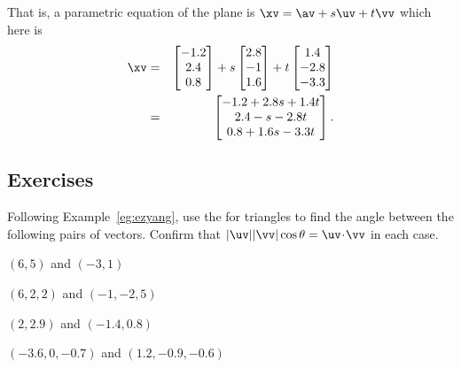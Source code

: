 \begin{example}
\begin{solution}
That is, a parametric equation of the plane is \(\xv=\av+s\uv+t\vv\) which here is
\begin{eqnarray*}
\xv&=&\begin{bmatrix} -1.2\\2.4\\0.8 \end{bmatrix}
+s\begin{bmatrix} 2.8\\-1\\1.6 \end{bmatrix}
+t\begin{bmatrix} 1.4\\-2.8\\-3.3 \end{bmatrix}
\\&=&\begin{bmatrix} -1.2+2.8s+1.4t\\2.4-s-2.8t\\0.8+1.6s-3.3t \end{bmatrix}.
\end{eqnarray*}
\end{solution}
\end{example}








\subsection{Exercises}



\begin{exercise} \label{ex:ezyang} 
Following Example~\ref{eg:ezyang}, use the  for triangles to find the angle between the following pairs of vectors.  
Confirm that \(|\uv||\vv|\cos\theta=\uv\cdot\vv\) in each case.
\begin{parts}
\item \((6,5)\) and \((-3,1)\)
\item \((6,2,2)\) and \((-1,-2,5)\)
\item \((2,2.9)\) and \((-1.4,0.8)\)
\item \((-3.6,0,-0.7)\) and \((1.2,-0.9,-0.6)\)
\end{parts}
\end{exercise}




